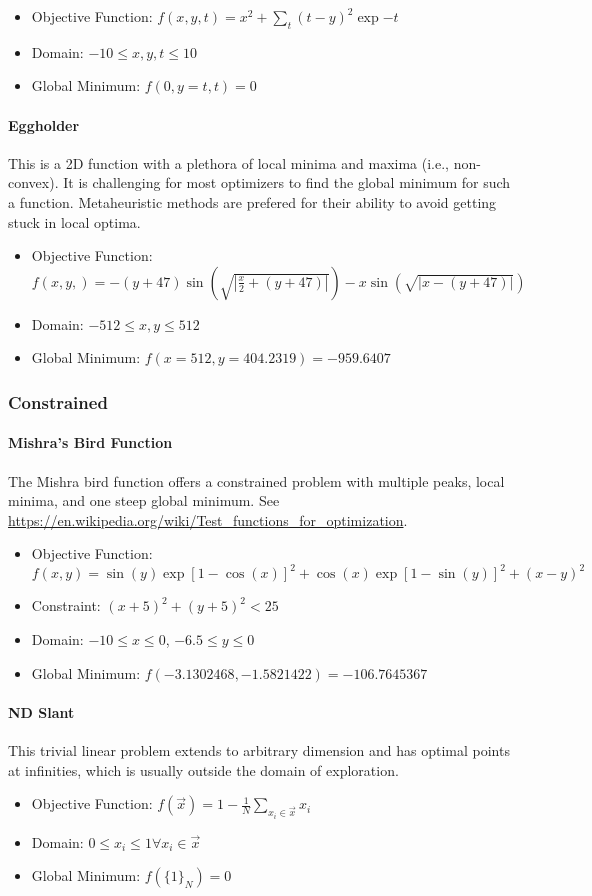 \begin{itemize}
  \item Objective Function: $f(x,y,t) = x^2 + \sum_{t} (t-y)^2 \exp{-t}$
  \item Domain: $-10 \leq x,y,t \leq 10$
  \item Global Minimum: $f(0,y=t,t) = 0$
\end{itemize}

\paragraph{Eggholder}
This is a 2D function with a plethora of local minima and maxima (i.e., non-convex). It is challenging for most optimizers to find the global minimum for such a function. Metaheuristic methods are prefered for their ability to avoid getting stuck in local optima.

\begin{itemize}
	\item Objective Function: $f(x,y,) =-(y+47) \sin(\sqrt{|\frac{x}{2}+(y+47)|}) - x\sin(\sqrt{|x - (y+47)|})$
	\item Domain: $-512 \leq x,y \leq 512$
	\item Global Minimum: $f(x=512, y=404.2319) = -959.6407$
\end{itemize}

\subsubsection{Constrained}
\paragraph{Mishra's Bird Function}
The Mishra bird function offers a constrained problem with multiple peaks, local minima, and one steep global
minimum.
See \url{https://en.wikipedia.org/wiki/Test_functions_for_optimization}.

\begin{itemize}
  \item Objective Function: $f(x,y) = \sin(y)\exp[1-\cos(x)]^2 + \cos(x)\exp[1-\sin(y)]^2 + (x-y)^2$
  \item Constraint: $(x+5)^2 + (y+5)^2 < 25$
  \item Domain: $-10 \leq x \leq 0$, $-6.5 \leq y \leq 0$
  \item Global Minimum: $f(-3.1302468, -1.5821422) = -106.7645367$
\end{itemize}

\paragraph{ND Slant}
This trivial linear problem extends to arbitrary dimension and has optimal points at infinities,
which is usually outside the domain of exploration.
\begin{itemize}
  \item Objective Function: $f(\vec x) = 1 - \frac{1}{N}\sum_{x_i\in \vec x} x_i$
  \item Domain: $0 \leq x_i \leq 1 \forall x_i \in \vec x$
  \item Global Minimum: $f(\{1\}_N) = 0$
\end{itemize}

